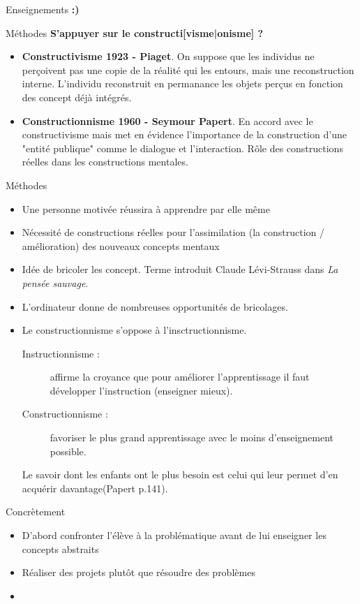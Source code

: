 \begin{frame}{Enseignements}
\Huge \textbf{:)}
\end{frame}

\begin{frame}{Méthodes}
\textbf{\Huge  S'appuyer sur le constructi[visme|onisme] ?}
\begin{itemize}
  \item \textbf{Constructivisme 1923 - Piaget}. On suppose que les individus ne perçoivent pas une copie de la réalité qui les entours, mais une reconstruction interne. L'individu reconstruit en permanance les objets perçus en fonction des concept déjà intégrés.
  \item \textbf{Constructionnisme 1960 - Seymour Papert}. En accord avec le constructivisme mais met en évidence l'importance de la construction d'une "entité publique" comme le dialogue et l'interaction. Rôle des constructions réelles dans les constructions mentales.
\end{itemize}
\end{frame}

\begin{frame}{Méthodes}
\begin{itemize}
  \item Une personne motivée réussira à apprendre par elle même
  \item Nécessité de constructions réelles pour l'assimilation (la construction / amélioration) des nouveaux concepts mentaux
  \item Idée de bricoler les concept. Terme introduit Claude Lévi-Strauss dans \textit{La pensée sauvage}. %
  \item L'ordinateur donne de nombreuses opportunités de bricolages.
  \item Le constructionnisme s'oppose à l'insctructionnisme.
  \begin{description}
    \item[Instructionnisme : ]affirme la croyance que pour améliorer l'apprentissage il faut développer l'instruction (enseigner mieux).
    \item[Constructionnisme : ]favoriser le plus grand apprentissage avec le moins d'enseignement possible.
    \end{description}
    \og{}Le savoir dont les enfants ont le plus besoin est celui qui leur permet d'en acquérir davantage\fg (Papert p.141).
\end{itemize}
\end{frame}

\begin{frame}{Concrètement}
\begin{itemize}
  \item D'abord confronter l'élève à la problématique avant de lui enseigner les concepts abstraits
  \item Réaliser des projets plutôt que résoudre des problèmes
  \item 
\end{itemize}
\end{frame}